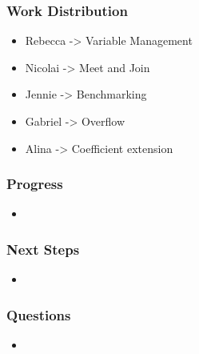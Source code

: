 \documentclass[english,xcolor=table]{i20lecture}
\subtitle{Relational Domains}
\begin{document}

\frame{\titlepage}



\begin{frame}
	\frametitle{Work Distribution}
	\begin{itemize}
		\item Rebecca -> Variable Management
		\item Nicolai -> Meet and Join
		\item Jennie -> Benchmarking
		\item Gabriel -> Overflow
		\item Alina -> Coefficient extension
	\end{itemize}
\end{frame}

\begin{frame}
	\frametitle{Progress}
		\begin{itemize}
			\item 
		\end{itemize}
\end{frame}

\begin{frame}
	\frametitle{Next Steps}
	\begin{itemize}
		\item 
	\end{itemize}
\end{frame}

\begin{frame}
	\frametitle{Questions}
	\begin{itemize}
		\item 
	\end{itemize}
\end{frame}

	
\end{document}
